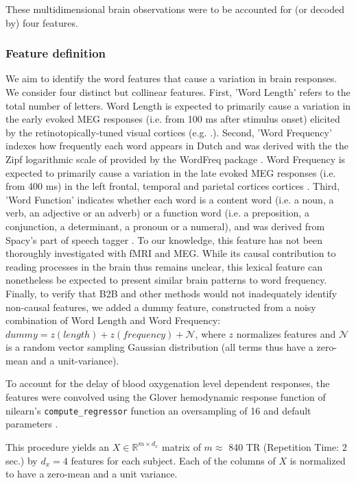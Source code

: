 These multidimensional brain observations were to be accounted for (or decoded by) four features.

\subsubsection{Feature definition}

We aim to identify the word features that cause a variation in brain responses. We consider four distinct but collinear features.
%
First, 'Word Length' refers to the total number of letters. Word Length is expected to primarily cause a variation in the early evoked MEG responses (i.e. from 100 ms after stimulus onset) elicited by the retinotopically-tuned visual cortices (e.g. \citep{pegado2014timing}.).
%
Second, 'Word Frequency' indexes how frequently each word appears in Dutch and
was derived with the the Zipf logarithmic scale of \citep{van2014subtlex}
provided by the WordFreq package \citep{speerwordfreq}. Word Frequency is
expected to primarily cause a variation in the late evoked MEG responses (i.e.
from 400 ms) in the left frontal, temporal and parietal cortices
cortices \citep{kutas2011thirty,mccandliss2003visual}.
%
Third, 'Word Function' indicates whether each word is a content word (i.e. a
noun, a verb, an adjective or an adverb) or a function word (i.e. a preposition,
a conjunction, a determinant, a pronoun or a numeral), and was derived from
Spacy's part of speech tagger \citep{spacy2}. To our knowledge, this feature has
not been thoroughly investigated with fMRI and MEG. While its causal contribution to
reading processes in the brain thus remains unclear, this lexical feature can
nonetheless be expected to present similar brain patterns to word frequency.
%
Finally, to verify that B2B and other methods would not inadequately identify non-causal features, we added a dummy feature, constructed from a noisy combination of Word Length and Word Frequency:
$dummy = z(length) + z(frequency) + \mathcal{N}$, where $z$ normalizes features
and $\mathcal{N}$ is a random vector sampling Gaussian distribution (all terms
thus have a zero-mean and a unit-variance).

To account for the delay of blood oxygenation level dependent responses, the
features were convolved using the Glover hemodynamic response function
of nilearn's \texttt{compute\_regressor} function an oversampling of 16 and default parameters \citep{nilearn}.

This procedure yields an $X \in \mathbb{R}^{m \times d_x}$ matrix of $m\approx$
840 TR (Repetition Time: 2 sec.) by
$d_x=4$ features for each subject. Each of the columns of $X$ is normalized to
have a zero-mean and a unit variance.



